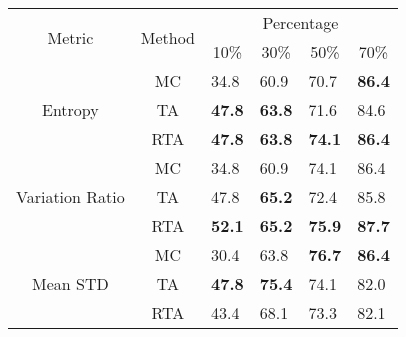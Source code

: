 \begin{table}[t]
\begin{minipage}{.5\textwidth}
  \centering
\label{table.rankingIOU_segnet}
\end{minipage}\begin{minipage}{.5\textwidth}
 \begin{tabular}{ccllll}
\hline
\multirow{2}{*}{Metric}          & \multirow{2}{*}{Method} & \multicolumn{4}{c}{Percentage}                                                                            \\
                                 &                         & \multicolumn{1}{c}{10\%} & \multicolumn{1}{c}{30\%} & \multicolumn{1}{c}{50\%} & \multicolumn{1}{c}{70\%} \\ \hline\hline
\multirow{3}{*}{Entropy}         & MC                      & 34.8                     & 60.9                     & 70.7                     & \textbf{86.4}                     \\
                                 & TA                      & \textbf{47.8}                     & \textbf{63.8}                     & 71.6                     & 84.6                     \\
                                 & RTA                     & \textbf{47.8}                     & \textbf{63.8}            & \textbf{74.1}            & \textbf{86.4}            \\ \hline
\multirow{3}{*}{Variation Ratio} & MC                      & 34.8                     & 60.9                     & 74.1                     & 86.4                     \\
                                 & TA                      & 47.8            & \textbf{65.2}                     & 72.4                     & 85.8                     \\
                                 & RTA                     & \textbf{52.1}                     & \textbf{65.2}            & \textbf{75.9}            & \textbf{87.7}            \\ \hline
\multirow{3}{*}{Mean STD}        & MC                      & 30.4            & 63.8                     & \textbf{76.7}            & \textbf{86.4}            \\
                                 & TA                      & \textbf{47.8}                     & \textbf{75.4}                     & 74.1                     & 82.0                     \\
                                 & RTA                     & 43.4                     & 68.1            & 73.3                     & 82.1                     \\ \hline

\end{tabular}
\end{minipage}
\end{table}
